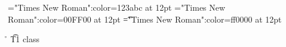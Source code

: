 \font\wzt="Times New Roman":color=123abc at 12pt
\font\zt="Times New Roman":color=00FF00 at 12pt
\font\t="Times New Roman":color=ff0000 at 12pt
 \r\n
\t{T1 class }




\bye
